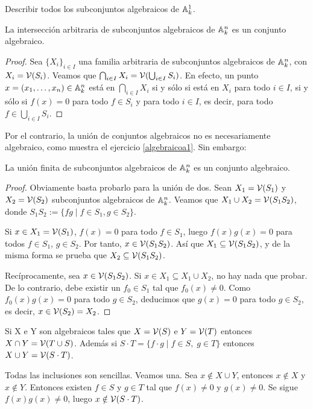 \documentclass[ACGA.tex]{subfiles}
\begin{document}
\begin{ejer}\label{algebraicoa1} Describir todos los subconjuntos algebraicos de $\mathbb{A}^1_k$.
 
\end{ejer}

\begin{prop}\label{interseccion} La intersección arbitraria de subconjuntos algebraicos de $\mathbb{A}^n_k$ es un conjunto algebraico.
 
\end{prop}

\begin{proof}
 Sea $\{X_i\}_{i\in I}$ una familia arbitraria de subconjuntos algebraicos de $\mathbb{A}^n_k$, con $X_i=\mathcal{V}(S_i)$. Veamos que $\bigcap_{i\in I}X_i=\mathcal{V}(\bigcup_{i\in I} S_i)$. En efecto, un punto $x=(x_1,\ldots,x_n)\in\mathbb{A}^n_k$ está en $\bigcap_{i\in I}X_i$ si y sólo si está en $X_i$ para todo $i\in I$, si y sólo si $f(x)=0$ para todo $f\in S_i$ y para todo $i\in I$, es decir, para todo $f\in \bigcup_{i\in I} S_i$.
\end{proof}

Por el contrario, la unión de conjuntos algebraicos no es necesariamente algebraico, como muestra el ejercicio \ref{algebraicoa1}. Sin embargo:

\begin{prop}\label{union} La unión finita de subconjuntos algebraicos de $\mathbb{A}^n_k$ es un conjunto algebraico.
 
\end{prop}

\begin{proof}
 Obviamente basta probarlo para la unión de dos. Sean $X_1=\mathcal{V}(S_1)$ y $X_2=\mathcal{V}(S_2)$ subconjuntos algebraicos de $\mathbb{A}^n_k$. Veamos que $X_1\cup X_2=\mathcal{V}(S_1S_2)$, donde $S_1S_2:=\{fg \mid f\in S_1,g\in S_2\}$.

Si $x\in X_1=\mathcal{V}(S_1)$, $f(x)=0$ para todo $f\in S_1$, luego $f(x)g(x)=0$ para todos $f\in S_1$, $g\in S_2$. Por tanto, $x\in \mathcal{V}(S_1S_2)$. Así que $X_1\subseteq \mathcal{V}(S_1S_2)$, y de la misma forma se prueba que $X_2\subseteq \mathcal{V}(S_1S_2)$. 

Recíprocamente, sea $x\in \mathcal{V}(S_1S_2)$. Si $x\in X_1\subseteq X_1\cup X_2$, no hay nada que probar. De lo contrario, debe existir un $f_0\in S_1$ tal que $f_0(x)\neq 0$. Como $f_0(x)g(x)=0$ para todo $g\in S_2$, deducimos que $g(x)=0$ para todo $g\in S_2$, es decir, $x\in \mathcal{V}(S_2)=X_2$.
\end{proof}

\begin{prop}
Si X e Y son algebraicos tales que $X=\mathcal{V}(S)$ e $Y=\mathcal{V}(T)$ entonces $X\cap Y = \mathcal{V}(T\cup S)$. Además si $S\cdot T = \{f\cdot g \mid f \in S,\; g \in T\}$ entonces $X\cup Y = \mathcal{V}(S\cdot T)$. 
\end{prop}
\begin{dem}
Todas las inclusiones son sencillas. Veamos una. Sea $x\notin X\cup Y$, entonces $x\notin X$ y $x\notin Y$. Entonces existen $f\in S$ y $g\in T$ tal que $f(x)\neq 0$ y $g(x)\neq 0$. Se sigue $f(x)g(x)\neq 0$, luego $x\notin \mathcal{V}(S\cdot T)$. \QED
\end{dem}
\end{document}
